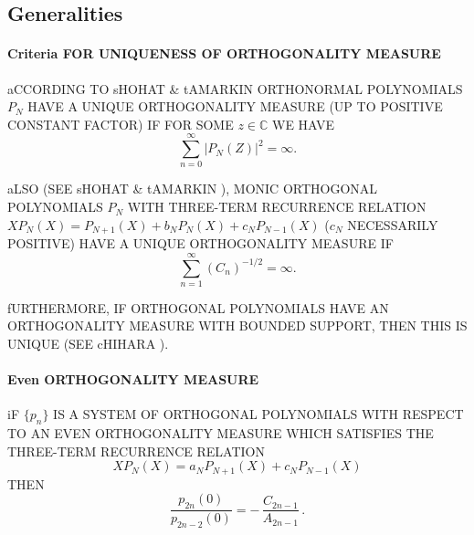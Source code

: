 \documentclass[twoside,11pt]{article}
\newcommand\CC{\mathbb{C}}
\newcommand\iy\infty
\begin{document}
\subsection*{Generalities} 
\label{sec_general} 
\paragraph{Criteria FOR UNIQUENESS OF ORTHOGONALITY MEASURE} 
aCCORDING TO sHOHAT \& tAMARKIN \cite[p.50]{K6} 
ORTHONORMAL POLYNOMIALS $P_N$ HAVE A UNIQUE ORTHOGONALITY MEASURE (UP TO POSITIVE 
CONSTANT FACTOR) IF 
FOR SOME $z\in\CC$ WE HAVE 
\begin{equation} 
\sum_{n=0}^\iy |P_N(Z)|^2 = \iy. 
\label{90} 
\end{equation} 
 
aLSO (SEE sHOHAT \& tAMARKIN \cite[p.59]{K6}), 
MONIC ORTHOGONAL POLYNOMIALS $P_N$ WITH THREE-TERM RECURRENCE RELATION 
$X P_N(X) = P_{N+1}(X)+b_N P_N(X)+c_N P_{N-1}(X)$ 
($c_N$ NECESSARILY POSITIVE) 
HAVE A UNIQUE ORTHOGONALITY MEASURE IF 
\begin{equation} 
\sum_{n=1}^\iy (C_n)^{-1/2}=\iy. 
\label{93} 
\end{equation} 
 
fURTHERMORE, IF ORTHOGONAL POLYNOMIALS HAVE AN ORTHOGONALITY MEASURE WITH 
BOUNDED SUPPORT, THEN THIS IS UNIQUE (SEE cHIHARA ). 
% 
\paragraph{Even ORTHOGONALITY MEASURE} 
iF $\{p_n\}$ IS A SYSTEM OF ORTHOGONAL POLYNOMIALS WITH RESPECT TO AN EVEN 
ORTHOGONALITY MEASURE WHICH SATISFIES THE THREE-TERM RECURRENCE RELATION 
\begin{equation*} 
X P_N(X)=a_N P_{N+1}(X)+c_N P_{N-1}(X) 
\end{equation*} 
THEN 
\begin{equation} 
\frac{p_{2n}(0)}{p_{2n-2}(0)}=-\,\frac{C_{2n-1}}{A_{2n-1}}\,. 
\label{1} 
\end{equation} 
% 
\end{document}
